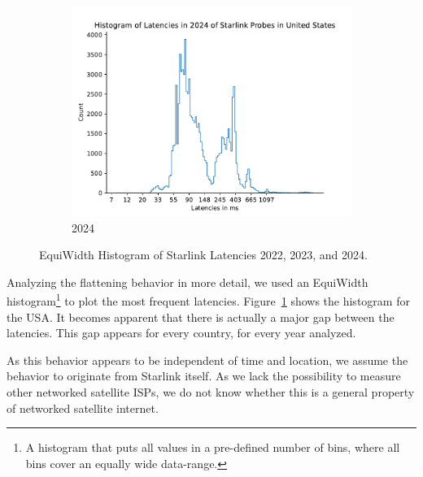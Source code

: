 \begin{figure}
\begin{subfigure}[b]{0.3\linewidth}
		\includegraphics[width=\linewidth]{chapters/4-results/latency/img/histogram_of_latencies_in_2024_of_starlink_probes_in_united_states.pdf}
		\caption{2024}
	\end{subfigure}
	\caption{EquiWidth Histogram of Starlink Latencies 2022, 2023, and 2024.}
	\label{fig:latency-histogram-usa}
\end{figure}

Analyzing the flattening behavior in more detail, we used an EquiWidth
histogram\footnote{A histogram that puts all values in a pre-defined number of
	bins, where all bins cover an equally wide data-range.} to plot the
most frequent latencies. Figure~\ref{fig:latency-histogram-usa} shows the
histogram for the USA. It becomes apparent that there is actually a major gap
between the latencies. This gap appears for every country, for every year
analyzed.

As this behavior appears to be independent of time and location, we assume the
behavior to originate from Starlink itself. As we lack the possibility to
measure other networked satellite ISPs, we do not know whether this is a
general property of networked satellite internet.

